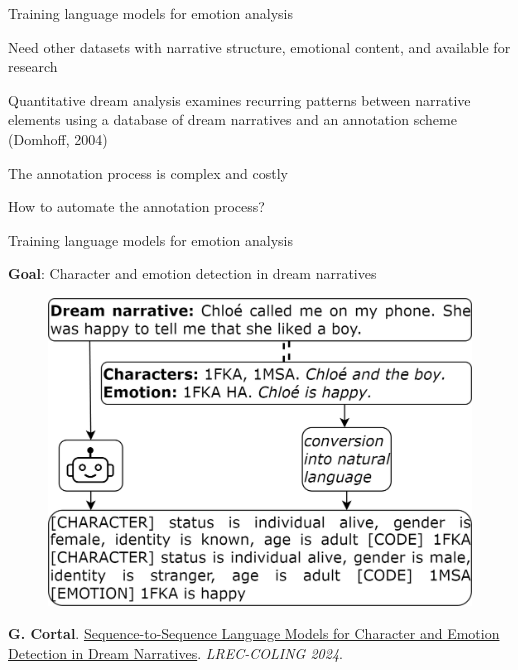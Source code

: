 \documentclass[handout,10pt]{beamer}
\begin{document}
\begin{frame}{Training language models for emotion analysis}

Need other datasets with narrative structure, emotional content, and available for research

\vspace{0.5cm}
\pause

Quantitative dream analysis examines recurring patterns between narrative elements using a database of dream narratives and an annotation scheme (Domhoff, 2004)

\vspace{0.5cm}
\pause

The annotation process is complex and costly

\vspace{0.5cm}
\pause

How to automate the annotation process?

    
\end{frame}

\begin{frame}{Training language models for emotion analysis}

\textbf{Goal}: Character and emotion detection in dream narratives

\pause

\begin{figure}
    \centering
    \includegraphics[width=0.6\linewidth]{img/dream_method.png}
    \label{fig:placeholder}
\end{figure}

\scriptsize

\textbf{G. Cortal}. \href{https://aclanthology.org/2024.lrec-main.1282/}{Sequence-to-Sequence Language Models for Character and Emotion Detection in Dream Narratives}. \textit{LREC-COLING 2024}.
    
\end{frame}
\end{document}
